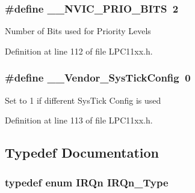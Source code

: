 \subsubsection[{\texorpdfstring{\+\_\+\+\_\+\+N\+V\+I\+C\+\_\+\+P\+R\+I\+O\+\_\+\+B\+I\+TS}{__NVIC_PRIO_BITS}}]{\setlength{\rightskip}{0pt plus 5cm}\#define \+\_\+\+\_\+\+N\+V\+I\+C\+\_\+\+P\+R\+I\+O\+\_\+\+B\+I\+TS~2}\hypertarget{group___l_p_c11xx___c_m_s_i_s_gae3fe3587d5100c787e02102ce3944460}{}\label{group___l_p_c11xx___c_m_s_i_s_gae3fe3587d5100c787e02102ce3944460}
Number of Bits used for Priority Levels 

Definition at line 112 of file L\+P\+C11xx.\+h.

\subsubsection[{\texorpdfstring{\+\_\+\+\_\+\+Vendor\+\_\+\+Sys\+Tick\+Config}{__Vendor_SysTickConfig}}]{\setlength{\rightskip}{0pt plus 5cm}\#define \+\_\+\+\_\+\+Vendor\+\_\+\+Sys\+Tick\+Config~0}\hypertarget{group___l_p_c11xx___c_m_s_i_s_gab58771b4ec03f9bdddc84770f7c95c68}{}\label{group___l_p_c11xx___c_m_s_i_s_gab58771b4ec03f9bdddc84770f7c95c68}
Set to 1 if different Sys\+Tick Config is used 

Definition at line 113 of file L\+P\+C11xx.\+h.



\subsection{Typedef Documentation}
\subsubsection[{\texorpdfstring{I\+R\+Qn\+\_\+\+Type}{IRQn_Type}}]{\setlength{\rightskip}{0pt plus 5cm}typedef enum {\bf I\+R\+Qn}  {\bf I\+R\+Qn\+\_\+\+Type}}\hypertarget{group___l_p_c11xx___c_m_s_i_s_gac3af4a32370fb28c4ade8bf2add80251}{}\label{group___l_p_c11xx___c_m_s_i_s_gac3af4a32370fb28c4ade8bf2add80251}


